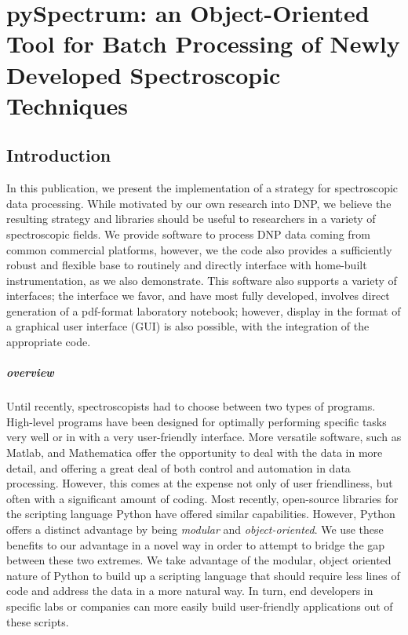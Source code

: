 \chapter{pySpectrum: an Object-Oriented Tool for Batch Processing of Newly Developed Spectroscopic Techniques}
\section{Introduction}\label{sec:writeup_software_intro}
In this publication,
    we present the implementation
    of a strategy for spectroscopic data processing.
While motivated by our own research into DNP,
    we believe the resulting strategy and libraries
    should be useful to researchers in a variety of spectroscopic fields.
We provide software to process DNP data coming from common commercial platforms,
    however, we the code also provides a sufficiently robust and flexible
    base to routinely and directly interface with home-built instrumentation,
    as we also demonstrate.
This software also supports a variety of interfaces;
    the interface we favor, and have most fully developed,
    involves direct generation
    of a pdf-format laboratory notebook;
    however, display in the format of a graphical
    user interface (GUI) is also possible,
    with the integration of the appropriate code.
\paragraph{overview}
Until recently,
    spectroscopists had to choose between two types of programs.
High-level
    programs have been designed for optimally performing specific tasks
    very well or in with a very user-friendly interface.
More versatile software,
    such as Matlab, and Mathematica offer the opportunity
    to deal with the data in more detail,
    and offering a great deal of both control and automation in data processing.
However,
    this comes at the expense not only of user friendliness,
    but often with a significant amount of coding.
Most recently,
    open-source libraries for the scripting language Python have
    offered similar capabilities.
However, Python offers a distinct advantage by being {\it modular} and {\it object-oriented}.
We use these benefits to our advantage in a novel way
    in order to attempt to bridge the gap between these two extremes.
We take advantage of the modular, object oriented nature of Python
    to build up a scripting language that should require
    less lines of code and address the data in a more natural way.
In turn, end developers in specific labs or companies
    can more easily build user-friendly applications
    out of these scripts.
